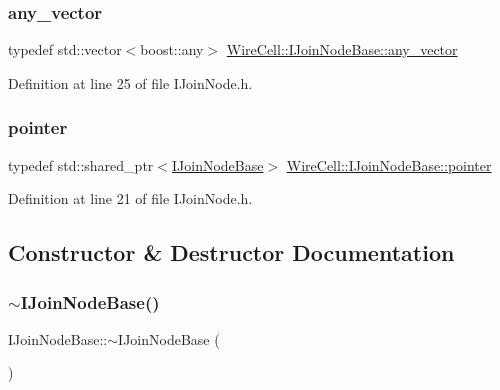 \subsubsection{\texorpdfstring{any\+\_\+vector}{any\_vector}}
{\footnotesize\ttfamily typedef std\+::vector$<$boost\+::any$>$ \hyperlink{class_wire_cell_1_1_i_join_node_base_a5d53e0f00c30b472677c399c7d358fa3}{Wire\+Cell\+::\+I\+Join\+Node\+Base\+::any\+\_\+vector}}



Definition at line 25 of file I\+Join\+Node.\+h.

\mbox{\label{class_wire_cell_1_1_i_join_node_base_a9491ccf1feadd927311d30eba0ff816b}} 
\subsubsection{\texorpdfstring{pointer}{pointer}}
{\footnotesize\ttfamily typedef std\+::shared\+\_\+ptr$<$\hyperlink{class_wire_cell_1_1_i_join_node_base}{I\+Join\+Node\+Base}$>$ \hyperlink{class_wire_cell_1_1_i_join_node_base_a9491ccf1feadd927311d30eba0ff816b}{Wire\+Cell\+::\+I\+Join\+Node\+Base\+::pointer}}



Definition at line 21 of file I\+Join\+Node.\+h.



\subsection{Constructor \& Destructor Documentation}
\mbox{\label{class_wire_cell_1_1_i_join_node_base_a3ce8adfd85d17ef7433cc615b934c488}} 
\subsubsection{\texorpdfstring{$\sim$\+I\+Join\+Node\+Base()}{~IJoinNodeBase()}}
{\footnotesize\ttfamily I\+Join\+Node\+Base\+::$\sim$\+I\+Join\+Node\+Base (\begin{DoxyParamCaption}{ }\end{DoxyParamCaption})\hspace{0.3cm}{\ttfamily [virtual]}}



